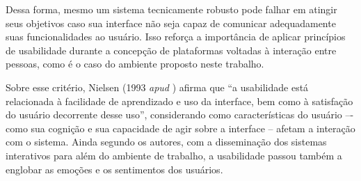 Dessa forma, mesmo um sistema tecnicamente robusto pode falhar em atingir seus objetivos caso sua interface não seja capaz de comunicar adequadamente suas funcionalidades ao usuário. Isso reforça a importância de aplicar princípios de usabilidade durante a concepção de plataformas voltadas à interação entre pessoas, como é o caso do ambiente proposto neste trabalho.

Sobre esse critério, Nielsen (1993 \textit{apud} ) afirma que “a usabilidade está relacionada à facilidade de aprendizado e uso da interface, bem como à satisfação do usuário decorrente desse uso”, considerando como características do usuário –- como sua cognição e sua capacidade de agir sobre a interface – afetam a interação com o sistema. Ainda segundo os autores, com a disseminação dos sistemas interativos para além do ambiente de trabalho, a usabilidade passou também a englobar as emoções e os sentimentos dos usuários.
